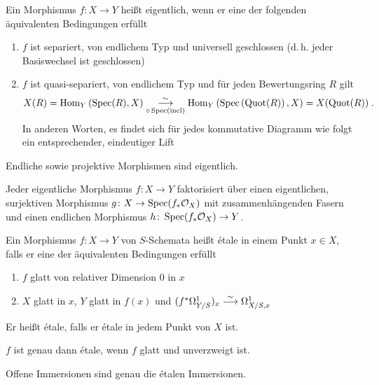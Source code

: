 \documentclass[german]{scrreprt}
\begin{document}
\begin{Definition}
  Ein Morphismus $f\colon X\to Y$ heißt eigentlich, wenn er eine der
  folgenden äquivalenten Bedingungen erfüllt
  \begin{enumerate}[label=(\roman*)]
  \item $f$ ist separiert, von endlichem Typ und universell
    geschlossen (d.\,h. jeder Basiswechsel ist geschlossen)
  \item $f$ ist quasi-separiert, von endlichem Typ und für jeden
    Bewertungsring $R$ gilt
    \begin{gather*}
      X(R)=\operatorname{Hom}_Y\left(\operatorname{Spec}(R), X\right) 
      \overset{\sim}{\underset{\circ\operatorname{Spec}(\operatorname{incl})}{\longrightarrow}}
      \operatorname{Hom}_Y\left(\operatorname{Spec}\left(\operatorname{Quot}(R)\right), X\right)=X(\operatorname{Quot}(R))\;.
    \end{gather*}
    In anderen Worten, es findet sich für jedes kommutative Diagramm
    wie folgt ein entsprechender, eindeutiger Lift
    \begin{center}
    \end{center}
  \end{enumerate}
  Endliche sowie projektive Morphismen sind eigentlich.
  \cite[9.5, Remark 5 und Theorem 9]{bosch}

  \begin{Bemerkung}
    Jeder eigentliche Morphismus $f\colon X\to Y$ faktorisiert über
    einen eigentlichen, surjektiven Morphismus $g\colon X\to
    \operatorname{Spec}(f_*\mathcal{O}_X)$ mit zusammenhängenden Fasern und einen endlichen
    Morphismus $h\colon \operatorname{Spec}(f_*\mathcal{O}_X)\to Y$.
    \cite[9.5, Theorem 12]{bosch}
  \end{Bemerkung}
\end{Definition}

\begin{Definition}%
  Ein Morphismus $f\colon X\to Y$ von $S$-Schemata heißt étale in
  einem Punkt $x\in X$, falls er eine der äquivalenten Bedingungen
  erfüllt 
  \begin{enumerate}[label=(\roman*)]
  \item $f$ glatt von relativer Dimension 0 in $x$
  \item $X$ glatt in $x$, $Y$ glatt in $f(x)$ und 
    $(f^*\Omega_{Y/S}^1)_x \overset{\sim}{\longrightarrow} \Omega_{X/S,x}^1$
  \end{enumerate}
  Er heißt étale, falls er étale in jedem Punkt von $X$ ist.
  \cite[8.5, Definition 1 und Corollary 12]{bosch}  

  $f$ ist genau dann étale, wenn $f$ glatt und unverzweigt ist.
  \cite[8.5, Proposition 6]{bosch}

  Offene Immersionen sind genau die étalen Immersionen.
  \cite[8.5, Lemma 7]{bosch}
\end{Definition}
\end{document}
